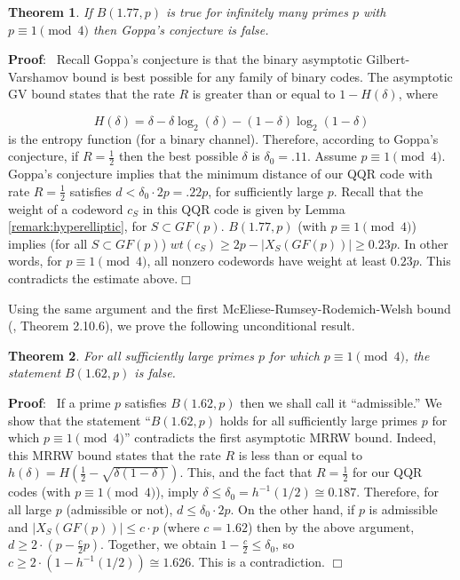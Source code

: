 \documentclass[submission%
]{dmtcs}
\newtheorem{theorem}{Theorem}
\def\pf{{\bf Proof}:\ }
\def\qed{$\Box$}
\begin{document}
\begin{theorem}
\label{thrm:main}
If $B(1.77,p)$ is true for infinitely many primes
$p$ with $p\equiv 1\pmod 4$ then Goppa's conjecture is false.
\end{theorem}

\pf
Recall Goppa's conjecture is that the binary asymptotic 
Gilbert-Varshamov bound is best possible for any family of binary codes.  
The asymptotic GV bound states that the rate $R$ 
is greater than or equal to $1-H(\delta)$, where 

\[
H(\delta)=\delta-\delta\log_2(\delta)-(1-\delta)\log_2(1-\delta)
\]  
is the entropy function (for a binary channel).
Therefore, according to Goppa's conjecture, 
if $R=\frac{1}{2}$ then the best possible $\delta$ is 
$\delta_0=.11$.  Assume $p\equiv 1\pmod 4$.
Goppa's conjecture implies that the minimum distance of our 
QQR code with rate $R=\frac{1}{2}$ satisfies $d<\delta_0\cdot 2p=.22p$,
for sufficiently large $p$.
Recall that the weight of a codeword $c_S$ in this QQR code 
is given by Lemma \ref{remark:hyperelliptic}, for $S\subset GF(p)$.
$B(1.77,p)$ (with $p\equiv 1\pmod 4$) implies (for all $S\subset GF(p)$)
$wt(c_S)\geq 2p-|X_S(GF(p))|\geq 0.23p$. In other words, for
$p\equiv 1\pmod 4$, all nonzero codewords have weight at least
$0.23p$.
This contradicts the estimate above.\qed

Using the same argument and the 
first McEliese-Rumsey-Rodemich-Welsh bound (\cite{HP}, Theorem 2.10.6),
we prove the following unconditional result.

\begin{theorem}
For all sufficiently large primes $p$ for which $p\equiv 1\pmod 4$,
the statement $B(1.62,p)$ is false.
\end{theorem}

\pf
If a prime $p$ satisfies $B(1.62,p)$ then we shall call it ``admissible.''
We show that the statement ``$B(1.62,p)$ holds for all sufficiently large
primes $p$ for which $p\equiv 1\pmod 4$''
contradicts the first asymptotic MRRW bound.
Indeed, this MRRW bound states that the rate $R$ 
is less than or equal to $h(\delta)=H(\frac{1}{2} - \sqrt{\delta(1-\delta)})$.
This, and the fact that $R=\frac{1}{2}$ for our QQR codes (with $p\equiv 1\pmod 4$), imply
$\delta \leq \delta_0 = h^{-1}(1/2)\cong 0.187$. 
Therefore, for all large $p$ (admissible or not),
$d\leq \delta_0\cdot 2p$. On the other hand, if $p$ is admissible and
$|X_S(GF(p))| \leq c\cdot p$ (where $c=1.62$) then 
by the above argument, $d\geq 2\cdot(p-\frac{c}{2}p)$.
Together, we obtain $1-\frac{c}{2}\leq\delta_0$, so
$c\geq 2\cdot (1-h^{-1}(1/2))\cong 1.626$. This is a contradiction.
\qed
\end{document}
